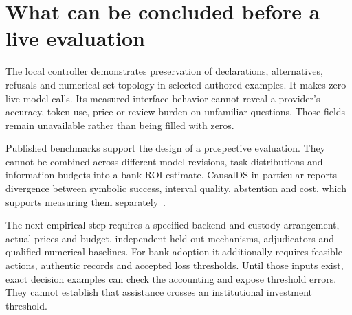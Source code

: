 \section{What can be concluded before a live evaluation}

The local controller demonstrates preservation of declarations, alternatives,
refusals and numerical set topology in selected authored examples. It makes
zero live model calls. Its measured interface behavior cannot reveal a
provider's accuracy, token use, price or review burden on unfamiliar questions.
Those fields remain unavailable rather than being filled with zeros.

Published benchmarks support the design of a prospective evaluation. They
cannot be combined across different model revisions, task distributions and
information budgets into a bank ROI estimate. CausalDS in particular reports
divergence between symbolic success, interval quality, abstention and cost,
which supports measuring them separately~\citep{v12_la_2607_08093}.

The next empirical step requires a specified backend and custody arrangement,
actual prices and budget, independent held-out mechanisms, adjudicators and
qualified numerical baselines. For bank adoption it additionally requires
feasible actions, authentic records and accepted loss thresholds. Until those
inputs exist, exact decision examples can check the accounting and expose
threshold errors. They cannot establish that assistance crosses an institutional
investment threshold.
